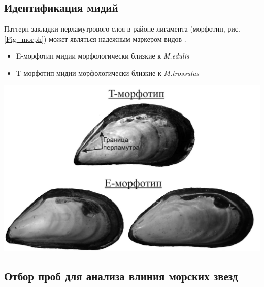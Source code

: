 \documentclass[a0,portrait]{a0poster}
\begin{document}
\begin{multicols}{2}
\subsection*{Идентификация мидий}


%
\begin{minipage}[t]{0.4\linewidth}

Паттерн закладки перламутрового слоя в районе лигамента (морфотип, рис. \ref{Fig_morph}) может являться надежным маркером видов \citep{katolikova2016genetic}.   

\begin{itemize}
  \item E-морфотип мидии морфологически близкие к \emph{M.edulis} 
  \item  T-морфотип мидии морфологически близкие к \emph{M.trossulus}
\end{itemize}
 

\end{minipage}\hspace{1cm}
%
\begin{minipage}[t]{0.5\linewidth}
	\begin{center} \vspace{0.1cm}
			\includegraphics[width=0.6\linewidth]{Morphotypes1.jpg}
			\label{Fig_morph}
		\end{center}\vspace{0.5cm}
\end{minipage}






\subsection*{Отбор проб для анализа влиния морских звезд}


\end{multicols}
\end{document}
